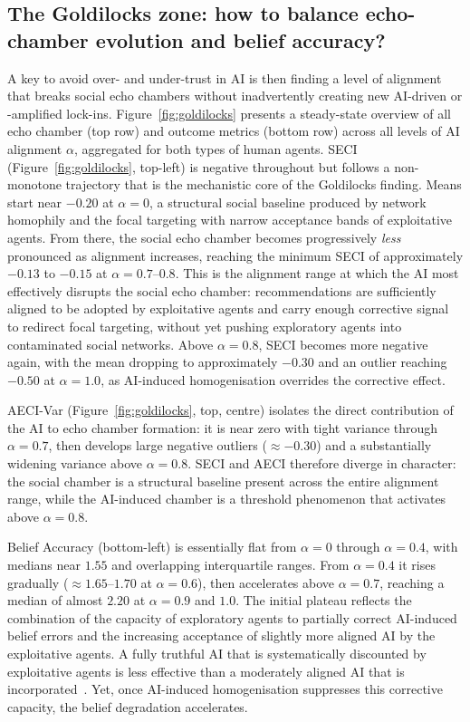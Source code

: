 \documentclass[pdflatex,sn-apa]{sn-jnl}%
\begin{document}
\subsection{The Goldilocks zone: how to balance echo-chamber evolution and belief accuracy?}
\label{sec:goldilocks}

A key to avoid over- and under-trust in AI is then finding a level of alignment that breaks social echo chambers without inadvertently creating new AI-driven or -amplified lock-ins. Figure~\ref{fig:goldilocks} presents a steady-state overview of all echo chamber (top row) and outcome metrics (bottom row) across all levels of AI alignment $\alpha$, aggregated for both types of human agents. SECI (Figure~\ref{fig:goldilocks}, top-left) is 
negative throughout but follows a non-monotone 
trajectory that is the mechanistic core of the 
Goldilocks finding. Means start near $-0.20$ at 
$\alpha = 0$, a structural social baseline 
produced by network homophily and the 
focal targeting with narrow acceptance bands of exploitative agents. From there, the social echo chamber becomes progressively \emph{less} pronounced 
as alignment increases, reaching the minimum SECI of approximately $-0.13$ to $-0.15$ 
at $\alpha = 0.7$--$0.8$. This is the 
alignment range at which the AI most effectively 
disrupts the social echo chamber: recommendations 
are sufficiently aligned to be adopted by 
exploitative agents and carry enough corrective 
signal to redirect focal targeting, without yet pushing exploratory agents into contaminated social networks. Above $\alpha = 0.8$, SECI becomes more negative again, with the mean dropping to approximately $-0.30$  and an outlier reaching $-0.50$ at $\alpha = 1.0$, as AI-induced homogenisation overrides the corrective effect. 

AECI-Var (Figure~\ref{fig:goldilocks}, top, centre) isolates the direct contribution of the AI to echo chamber formation: it is near zero with 
tight variance through $\alpha = 0.7$, then develops 
large negative outliers ($\approx -0.30$) and a
substantially widening variance above $\alpha = 
0.8$. SECI and AECI therefore diverge in character: the social chamber is a structural baseline present across the entire alignment range, while the AI-induced chamber is a threshold phenomenon that activates above $\alpha = 0.8$.

Belief Accuracy (bottom-left) is essentially flat from
$\alpha = 0$ through $\alpha = 0.4$, with medians near
$1.55$ and overlapping interquartile ranges. From
$\alpha = 0.4$ it rises gradually ($\approx 1.65$--$1.70$ at $\alpha = 0.6$), then accelerates above $\alpha = 0.7$, reaching a median of almost $2.20$ at $\alpha = 0.9$ and $1.0$. The initial plateau reflects the combination of the capacity of exploratory agents to partially correct AI-induced belief errors and the increasing acceptance of slightly more aligned AI by the exploitative agents. A fully truthful AI that
is systematically discounted by exploitative agents is
less effective than a moderately aligned AI that is
incorporated~\citep{WestAydin2025}. Yet, once AI-induced homogenisation suppresses this corrective capacity, the belief degradation accelerates.
\end{document}
